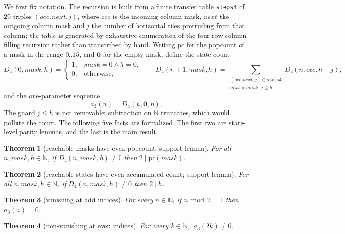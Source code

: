 \documentclass[11pt]{article}
\newtheorem{theorem}{Theorem}
\begin{document}
We first fix notation. The recursion is built from a finite transfer table
\texttt{steps4} of 29 triples $(occ,next,j)$, where $occ$ is the incoming column mask,
$next$ the outgoing column mask and $j$ the number of horizontal tiles protruding from that
column; the table is generated by exhaustive enumeration of the four-row column-filling
recursion rather than transcribed by hand. Writing $\mathrm{pc}$ for the popcount of a mask
in the range $0..15$, and $\mathbf{0}$ for the empty mask, define the state count
\[
D_4(0,mask,h) = \begin{cases} 1, & mask = 0 \wedge h = 0,\\ 0, & \text{otherwise},\end{cases}
\qquad
D_4(n+1,mask,h) = \!\!\sum_{\substack{(occ,next,j) \in \texttt{steps4}\\ next = mask,\; j \le h}}\!\! D_4(n,occ,h-j),
\]
and the one-parameter sequence
\[
a_3(n) = D_4(n,\mathbf{0},n).
\]
The guard $j \le h$ is not removable: subtraction on $\mathbb{N}$ truncates, which would
pollute the count. The following five facts are formalized. The first two are state-level
parity lemmas, and the last is the main result.

\begin{theorem}[reachable masks have even popcount; support lemma]
\label{thm:t3a}
For all $n, mask, h \in \mathbb{N}$, if $D_4(n,mask,h) \neq 0$ then $2 \mid \mathrm{pc}(mask)$.
\end{theorem}

\begin{theorem}[reachable states have even accumulated count; support lemma]
\label{thm:t3b}
For all $n, mask, h \in \mathbb{N}$, if $D_4(n,mask,h) \neq 0$ then $2 \mid h$.
\end{theorem}

\begin{theorem}[vanishing at odd indices]
\label{thm:t3c}
For every $n \in \mathbb{N}$, if $n \bmod 2 = 1$ then $a_3(n) = 0$.
\end{theorem}

\begin{theorem}[non-vanishing at even indices]
\label{thm:t3d}
For every $k \in \mathbb{N}$, $\;a_3(2k) \neq 0$.
\end{theorem}
\end{document}
